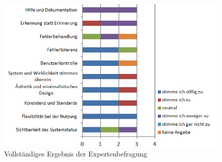 \begin{figure}
\centering
\includegraphics[width=\hsize]{images/bewertung_expert_complete}
\caption{Vollständiges Ergebnis der Expertenbefragung}
\label{bewertungExpertComplete}
\end{figure}